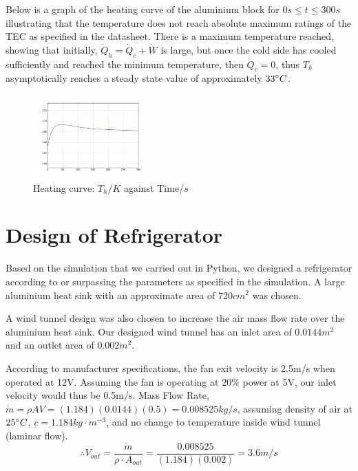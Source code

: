 \documentclass[12pt,a4paper]{IEEEtran}
\begin{document}
	Below is a graph of the heating curve of the aluminium block for $0s \leq t \leq 300s$ illustrating that the temperature does not reach absolute maximum ratings of the TEC as specified in the datasheet. There is a maximum temperature reached, showing that initially, $\dot{Q}_h = \dot{Q}_c + \dot{W}$ is large, but once the cold side has cooled sufficiently and reached the minimum temperature, then $\dot{Q}_c = 0$, thus $T_h$ asymptotically reaches a steady state value of approximately $33\degree C$.
	\begin{figure}[H]
		\begin{center}
			\includegraphics[width=0.4\textwidth]{T_h.png}
			\caption{Heating curve: $T_h/K$ against Time/$s$}
			\label{fig:heatingcurve}
		\end{center}
	\end{figure} \par

	\section{Design of Refrigerator}
	Based on the simulation that we carried out in Python, we designed a refrigerator according to or surpassing the parameters as specified in the simulation. A large aluminium heat sink with an approximate area of $720 cm^2$ was chosen.\linebreak
	
	A wind tunnel design was also chosen to increase the air mass flow rate over the aluminium heat sink. Our designed wind tunnel has an inlet area of $0.0144m^2$ and an outlet area of $0.002m^2$.\linebreak
	
	According to manufacturer specifications, the fan exit velocity is 2.5m/s when operated at 12V.  Assuming the fan is operating at 20\% power at 5V, our inlet velocity would thus be 0.5m/s.
	Mass Flow Rate, $\dot{m} = \rho AV = (1.184)(0.0144)(0.5) = 0.008525kg/s$, assuming density of air at $25\degree C$, $c = 1.184kg\cdot m^{-3}$, and no change to temperature inside wind tunnel (laminar flow).
	\linebreak
	$$\therefore V_{out} = \frac{\dot{m}}{\rho \cdot A_{out}} = \frac{0.008525}{(1.184)(0.002)} = 3.6m/s$$
	
\end{document}
